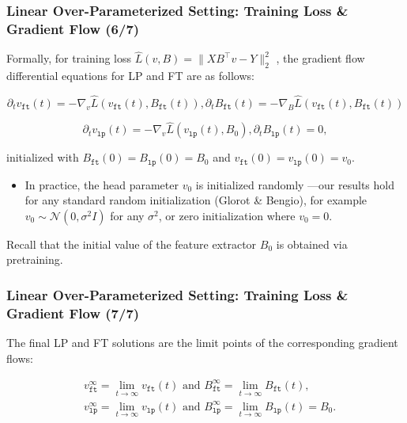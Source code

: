 \documentclass[16pt,aspectratio=169]{beamer}
\begin{document}
\begin{frame}
    \frametitle{Linear Over-Parameterized Setting: Training Loss \& Gradient Flow (6/7)}

    
    Formally, for training loss $\widehat{L}(v, B) = \| XB^\top v - Y \|_2^2$ , the gradient flow differential equations for LP and FT are as follows:

    \begin{equation}
        \partial_t v_{\mathtt{ft}}(t)=-\nabla_v \widehat{L}\left(v_{\mathtt{ft}}(t), B_{\mathtt{ft}}(t)\right),
        \partial_t B_{\mathtt{ft}}(t)=-\nabla_B \widehat{L}\left(v_{\mathtt{ft}}(t), B_{\mathtt{ft}}(t)\right)
    \end{equation}

    \begin{equation}
        \partial_t v_{\mathtt{lp}}(t)=-\nabla_v \widehat{L}\left(v_{\mathtt{lp}}(t), B_0\right), \partial_t B_{\mathtt{lp}}(t)=0,
    \end{equation}

    initialized with $B_{\mathtt{ft}}(0)=B_{\mathtt{lp}}(0)=B_0$ and $v_{\mathtt{ft}}(0)=v_{\mathtt{lp}}(0)=v_0$. 

    \begin{itemize}
        \item In practice, the head parameter $v_0$ is initialized randomly —our results hold for any standard random initialization (Glorot \& Bengio), for example $v_0 \sim \mathcal{N}\left(0, \sigma^2 I\right)$ for any $\sigma^2$, or zero initialization where $v_0=0$. 
    \end{itemize}

    Recall that the initial value of the feature extractor $B_0$ is obtained via pretraining.

\end{frame}

\begin{frame}
    \frametitle{Linear Over-Parameterized Setting: Training Loss \& Gradient Flow (7/7)}

    The final LP and FT solutions are the limit points of the corresponding gradient flows:

    \begin{equation}
        \begin{aligned}
            & v_{\mathtt{ft}}^{\infty}=\lim _{t \rightarrow \infty} v_{\mathtt{ft}}(t) \text { and } B_{\mathtt{ft}}^{\infty}=\lim _{t \rightarrow \infty} B_{\mathtt{ft}}(t), \\
            & v_{\mathtt{lp}}^{\infty}=\lim _{t \rightarrow \infty} v_{\mathtt{lp}}(t) \text { and } B_{\mathtt{lp}}^{\infty}=\lim _{t \rightarrow \infty} B_{\mathtt{lp}}(t)=B_0 .
        \end{aligned}            
    \end{equation}

\end{frame}
\end{document}
